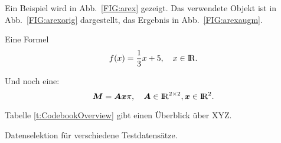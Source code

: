 Ein Beispiel wird in Abb.\ \ref{FIG:arex} gezeigt.
Das verwendete Objekt ist in Abb.\ \ref{FIG:arexorig} dargestellt, das Ergebnis in Abb.\ \ref{FIG:arexaugm}.

Eine Formel
\begin{equation}
\label{eq:cvp:test}
f(x) = \frac{1}{3} x + 5, \quad x \in \mathord{\mathrm{I\!R}}.
\end{equation}

Und noch eine:
\begin{equation}
\label{eq:cvp:matvec}
\bm{M}  = \bm{Ax} \pi, \quad \bm{A} \in \mathord{\mathrm{I\!R}}^{2 \times 2}, \bm{x} \in \mathord{\mathrm{I\!R}}^2.
\end{equation}

Tabelle \ref{t:CodebookOverview} gibt einen Überblick über XYZ.

\begin{table}[t]
	\centering\small
	
	\caption[Testtabelle]{Datenselektion für verschiedene Testdatensätze.}
	\label{t:CodebookOverview}
\end{table}


